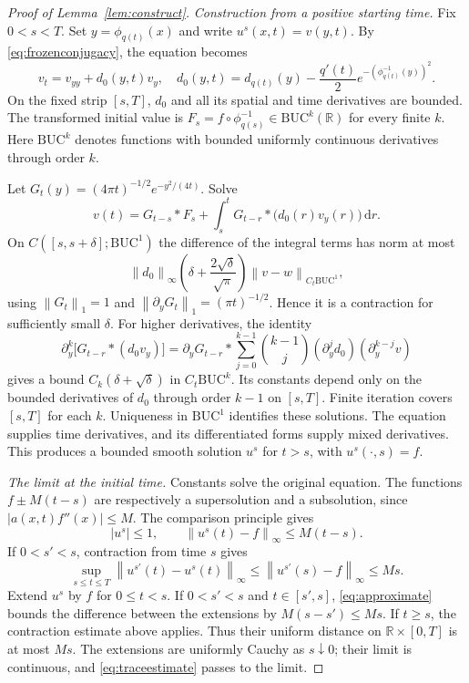\documentclass[11pt,reqno]{amsart}
\numberwithin{equation}{section}
\theoremstyle{definition}
\theoremstyle{remark}
\newcommand{\R}{\mathbb R}
\newcommand{\BUC}{\mathrm{BUC}}
\newcommand{\dd}{\,\mathrm d}
\newcommand{\norm}[1]{\left\lVert#1\right\rVert}
\begin{document}
\begin{proof}[Proof of Lemma~\ref{lem:construct}]
\emph{Construction from a positive starting time.}
Fix $0<s<T$. Set $y=\phi_{q(t)}(x)$ and write $u^s(x,t)=v(y,t)$. By \eqref{eq:frozenconjugacy}, the equation becomes
\begin{equation}\label{eq:heatdrift}
 v_t=v_{yy}+d_0(y,t)v_y,
 \quad
 d_0(y,t)=d_{q(t)}(y)
 -\frac{q'(t)}2e^{-(\phi_{q(t)}^{-1}(y))^2}.
\end{equation}
On the fixed strip $[s,T]$, $d_0$ and all its spatial and time derivatives are bounded. The transformed initial value is $F_s=f\circ\phi_{q(s)}^{-1}\in\BUC^k(\R)$ for every finite $k$. Here $\BUC^k$ denotes functions with bounded uniformly continuous derivatives through order $k$.

Let $G_t(y)=(4\pi t)^{-1/2}e^{-y^2/(4t)}$. Solve
\begin{equation}\label{eq:mild}
 v(t)=G_{t-s}*F_s+
 \int_s^tG_{t-r}*\bigl(d_0(r)v_y(r)\bigr)\dd r.
\end{equation}
On $C([s,s+\delta];\BUC^1)$ the difference of the integral terms has norm at most
\[
 \norm{d_0}_\infty\left(\delta+\frac{2\sqrt\delta}{\sqrt\pi}\right)
 \norm{v-w}_{C_t\BUC^1},
\]
using $\norm{G_t}_1=1$ and $\norm{\partial_yG_t}_1=(\pi t)^{-1/2}$. Hence it is a contraction for sufficiently small $\delta$. For higher derivatives, the identity
\begin{equation}\label{eq:highmild}
 \partial_y^k\bigl[G_{t-r}*(d_0v_y)\bigr]
 =\partial_yG_{t-r}*
 \sum_{j=0}^{k-1}\binom{k-1}{j}
 (\partial_y^jd_0)(\partial_y^{k-j}v)
\end{equation}
gives a bound $C_k(\delta+\sqrt\delta)$ in $C_t\BUC^k$. Its constants depend only on the bounded derivatives of $d_0$ through order $k-1$ on $[s,T]$. Finite iteration covers $[s,T]$ for each $k$. Uniqueness in $\BUC^1$ identifies these solutions. The equation supplies time derivatives, and its differentiated forms supply mixed derivatives. This produces a bounded smooth solution $u^s$ for $t>s$, with $u^s(\cdot,s)=f$.

\emph{The limit at the initial time.}
Constants solve the original equation. The functions $f\pm M(t-s)$ are respectively a supersolution and a subsolution, since $|a(x,t)f''(x)|\leq M$. The comparison principle gives
\begin{equation}\label{eq:approximate}
 |u^s|\leq1,\qquad
 \norm{u^s(t)-f}_\infty\leq M(t-s).
\end{equation}
If $0<s'<s$, contraction from time $s$ gives
\[
 \sup_{s\leq t\leq T}\norm{u^{s'}(t)-u^s(t)}_\infty
 \leq\norm{u^{s'}(s)-f}_\infty\leq Ms.
\]
Extend $u^s$ by $f$ for $0\leq t<s$.  If $0<s'<s$ and
$t\in[s',s]$, \eqref{eq:approximate} bounds the difference between the
extensions by $M(s-s')\leq Ms$.  If $t\geq s$, the contraction estimate
above applies.  Thus their uniform distance on $\R\times[0,T]$ is at
most $Ms$.  The extensions are uniformly Cauchy as $s\downarrow0$;
their limit is continuous, and \eqref{eq:traceestimate} passes to the
limit.


\end{proof}
\end{document}
